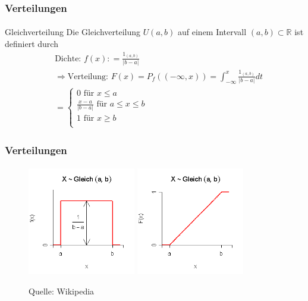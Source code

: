 \documentclass{beamer}
\begin{document}
 \begin{frame}
    \frametitle{Verteilungen}
\framesubtitle{}

\begin{block}{Gleichverteilung}
Die Gleichverteilung $U{(a,b)}$ auf einem Intervall $(a,b) \subset \mathbb{R}$ ist definiert durch
\begin{align*}
& \text{Dichte: } f (x) : = \frac{1_{(a,b)}}{|b-a| } \\
& \Rightarrow \text{Verteilung: } F (x) =  P_f( (-\infty, x))  =  \int_{-\infty}^{x} \frac{1_{(a,b)}}{|b-a|} dt\\\
& = \begin {cases} 0 \text{ für } x \leq a \\   \frac{x-a}{|b-a|} \text{ für } a \leq x \leq b \\ 1 \text{ für }  x \geq b \\  \end{cases}
\end{align*}
\end{block}

 \end{frame}

\begin{frame}
    \frametitle{Verteilungen}
\framesubtitle{}

\begin{figure}[htp]
      \centering
    \includegraphics[width=0.42\textwidth]{img/gleichverteilung1}
    \includegraphics[width=0.42\textwidth]{img/gleichverteilung2}
      \caption{Quelle: Wikipedia}
\end{figure}
 \end{frame}
\end{document}
